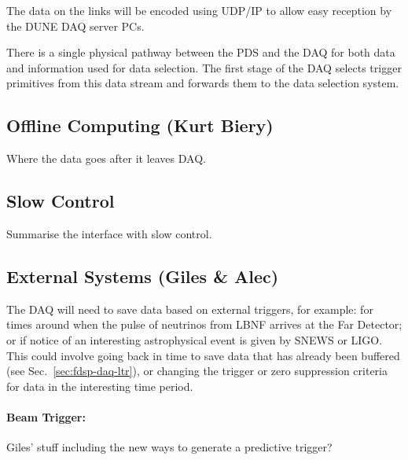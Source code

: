 The data on the links will be encoded using UDP/IP to allow easy
reception by the DUNE DAQ server PCs.

There is a single physical pathway between the PDS and the DAQ for
both data and information used for data selection. The first stage of
the DAQ selects trigger primitives from this data stream and forwards
them to the data selection system.

\subsection{Offline Computing (Kurt Biery)}
\label{sec:fdsp-daq-intfc-fnal-cmptg}

Where the data goes after it leaves DAQ.

\subsection{Slow Control}
\label{sec:fdsp-daq-intfc-ext}

Summarise the interface with slow control.


\subsection{External Systems (Giles \& Alec)}
\label{sec:fdsp-daq-intfc-ext}


The DAQ will need to save data based on external triggers, for example:
for times around when the pulse of neutrinos from LBNF arrives at the
Far Detector; or if notice of an interesting astrophysical event is
given by SNEWS\cite{snews} or LIGO.  This could involve going back in
time to save data that has already been buffered (see
Sec.~\ref{sec:fdsp-daq-ltr}), or changing the trigger or zero
suppression criteria for data in the interesting time period.

\paragraph{Beam Trigger:} Giles' stuff including the new ways to
generate a predictive trigger?

